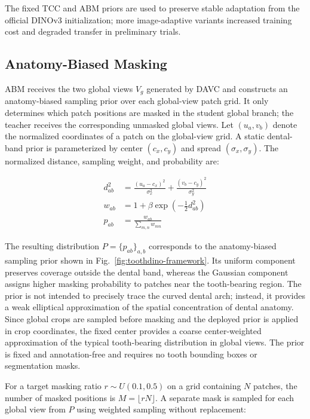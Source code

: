 \documentclass[conference]{IEEEtran}
\newcommand{\DAVC}{\textsc{DAVC}}
\newcommand{\TCC}{\textsc{TCC}}
\newcommand{\ABM}{\textsc{ABM}}
\begin{document}
The fixed \TCC{} and \ABM{} priors are used to preserve stable adaptation from the official DINOv3 initialization; more image-adaptive variants increased training cost and degraded transfer in preliminary trials.







\subsection{Anatomy-Biased Masking}
\label{sec:abm}

\ABM{} receives the two global views $V_g$ generated by \DAVC{} and
constructs an anatomy-biased sampling prior over each global-view patch
grid. It only determines which patch positions are masked in the
student global branch; the teacher receives the corresponding
unmasked global views. Let $(u_a,v_b)$ denote the normalized
coordinates of a patch on the global-view grid. A static dental-band
prior is parameterized by center $(c_x,c_y)$ and spread
$(\sigma_x,\sigma_y)$. The normalized distance, sampling weight, and
probability are:

\begin{align}
d_{ab}^{2}
&=
\frac{(u_a-c_x)^2}{\sigma_x^2}
+
\frac{(v_b-c_y)^2}{\sigma_y^2}
\label{eq:mask-prior-distance}
\\
w_{ab}
&=
1+\beta\exp\left(-\frac{1}{2}d_{ab}^{2}\right)
\label{eq:mask-prior-weight}
\\
p_{ab}
&=
\frac{w_{ab}}{\sum_{m,n}w_{mn}}
\label{eq:mask-prior-probability}
\end{align}

The resulting distribution
$P=\{p_{ab}\}_{a,b}$ corresponds to the anatomy-biased sampling prior
shown in Fig.~\ref{fig:toothdino-framework}. Its uniform component
preserves coverage outside the dental band, whereas the Gaussian
component assigns higher masking probability to patches near the
tooth-bearing region. The prior is not intended to precisely trace the
curved dental arch; instead, it provides a weak elliptical
approximation of the spatial concentration of dental anatomy. Since
global crops are sampled before masking and the deployed prior is
applied in crop coordinates, the fixed center provides a coarse
center-weighted approximation of the typical tooth-bearing distribution
in global views. The prior is fixed and annotation-free and requires no
tooth bounding boxes or segmentation masks.

For a target masking ratio $r\sim U(0.1,0.5)$ on a grid containing
$N$ patches, the number of masked positions is
$M=\lfloor rN\rfloor$. A separate mask is sampled for each global view
from $P$ using weighted sampling without replacement:
\end{document}
